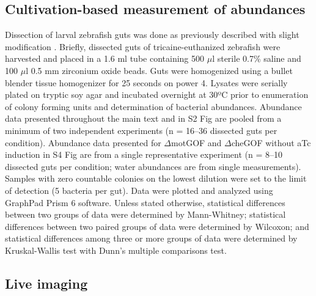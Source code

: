 \subsection{Cultivation-based measurement of abundances}

Dissection of larval zebrafish guts was done as previously described with slight modification \cite{milligan-myhre_study_2011}. Briefly, dissected guts of tricaine-euthanized zebrafish were harvested and placed in a 1.6 ml tube containing 500 $\mu$l sterile 0.7\% saline and 100 $\mu$l 0.5 mm zirconium oxide beads. Guts were homogenized using a bullet blender tissue homogenizer for 25 seconds on power 4. Lysates were serially plated on tryptic soy agar and incubated overnight at 30ºC prior to enumeration of colony forming units and determination of bacterial abundances. Abundance data presented throughout the main text and in S2 Fig are pooled from a minimum of two independent experiments (n = 16–36 dissected guts per condition). Abundance data presented for $\Delta$motGOF and $\Delta$cheGOF without aTc induction in S4 Fig are from a single representative experiment (n = 8–10 dissected guts per condition; water abundances are from single measurements). Samples with zero countable colonies on the lowest dilution were set to the limit of detection (5 bacteria per gut). Data were plotted and analyzed using GraphPad Prism 6 software. Unless stated otherwise, statistical differences between two groups of data were determined by Mann-Whitney; statistical differences between two paired groups of data were determined by Wilcoxon; and statistical differences among three or more groups of data were determined by Kruskal-Wallis test with Dunn's multiple comparisons test.  

\subsection{Live imaging}

